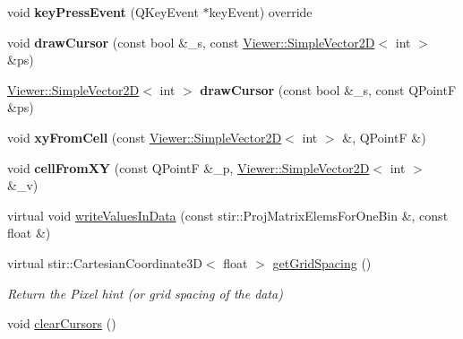 \begin{DoxyCompactItemize}
void {\bfseries key\+Press\+Event} (Q\+Key\+Event $\ast$key\+Event) override
\item 
\mbox{\label{classdisplay__screen__raster_adf6cfbba94df093fcebc987dc6ca582d}} 
void {\bfseries draw\+Cursor} (const bool \&\+\_\+s, const \mbox{\hyperlink{classViewer_1_1SimpleVector2D}{Viewer\+::\+Simple\+Vector2D}}$<$ int $>$ \&ps)
\item 
\mbox{\label{classdisplay__screen__raster_a8f54873f88a76ab9155def0e6e8837f4}} 
\mbox{\hyperlink{classViewer_1_1SimpleVector2D}{Viewer\+::\+Simple\+Vector2D}}$<$ int $>$ {\bfseries draw\+Cursor} (const bool \&\+\_\+s, const Q\+PointF \&ps)
\item 
\mbox{\label{classdisplay__screen__raster_a7a1e51868bb80d1322a15f9024bd8360}} 
void {\bfseries xy\+From\+Cell} (const \mbox{\hyperlink{classViewer_1_1SimpleVector2D}{Viewer\+::\+Simple\+Vector2D}}$<$ int $>$ \&, Q\+PointF \&)
\item 
\mbox{\label{classdisplay__screen__raster_a9c07112a8c204841669c597486091d33}} 
void {\bfseries cell\+From\+XY} (const Q\+PointF \&\+\_\+p, \mbox{\hyperlink{classViewer_1_1SimpleVector2D}{Viewer\+::\+Simple\+Vector2D}}$<$ int $>$ \&\+\_\+v)
\item 
virtual void \mbox{\hyperlink{classdisplay__screen__raster_a7cfddde7af1d6bb730a43b5cd13af34f}{write\+Values\+In\+Data}} (const stir\+::\+Proj\+Matrix\+Elems\+For\+One\+Bin \&, const float \&)
\item 
\mbox{\label{classdisplay__screen__raster_a494cf5aca93f26d87e7d4452c17852b8}} 
virtual stir\+::\+Cartesian\+Coordinate3D$<$ float $>$ \mbox{\hyperlink{classdisplay__screen__raster_a494cf5aca93f26d87e7d4452c17852b8}{get\+Grid\+Spacing}} ()
\begin{DoxyCompactList}\small\item\em Return the Pixel hint (or grid spacing of the data) \end{DoxyCompactList}\item 
void \mbox{\hyperlink{classdisplay__screen__raster_a0469e5189411a5b83d6386510832d46d}{clear\+Cursors}} ()
\item 
\mbox{\label{classdisplay__screen_a27d55d66129e2f3b99314c73d5457eaf}} 

\end{DoxyCompactItemize}
